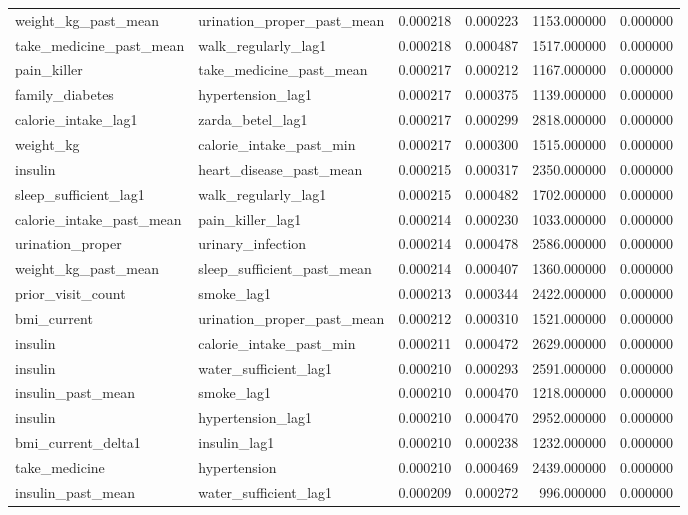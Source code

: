 \begin{longtable}{llrrrr}
weight\_kg\_past\_mean & urination\_proper\_past\_mean & 0.000218 & 0.000223 & 1153.000000 & 0.000000 \\
take\_medicine\_past\_mean & walk\_regularly\_lag1 & 0.000218 & 0.000487 & 1517.000000 & 0.000000 \\
pain\_killer & take\_medicine\_past\_mean & 0.000217 & 0.000212 & 1167.000000 & 0.000000 \\
family\_diabetes & hypertension\_lag1 & 0.000217 & 0.000375 & 1139.000000 & 0.000000 \\
calorie\_intake\_lag1 & zarda\_betel\_lag1 & 0.000217 & 0.000299 & 2818.000000 & 0.000000 \\
weight\_kg & calorie\_intake\_past\_min & 0.000217 & 0.000300 & 1515.000000 & 0.000000 \\
insulin & heart\_disease\_past\_mean & 0.000215 & 0.000317 & 2350.000000 & 0.000000 \\
sleep\_sufficient\_lag1 & walk\_regularly\_lag1 & 0.000215 & 0.000482 & 1702.000000 & 0.000000 \\
calorie\_intake\_past\_mean & pain\_killer\_lag1 & 0.000214 & 0.000230 & 1033.000000 & 0.000000 \\
urination\_proper & urinary\_infection & 0.000214 & 0.000478 & 2586.000000 & 0.000000 \\
weight\_kg\_past\_mean & sleep\_sufficient\_past\_mean & 0.000214 & 0.000407 & 1360.000000 & 0.000000 \\
prior\_visit\_count & smoke\_lag1 & 0.000213 & 0.000344 & 2422.000000 & 0.000000 \\
bmi\_current & urination\_proper\_past\_mean & 0.000212 & 0.000310 & 1521.000000 & 0.000000 \\
insulin & calorie\_intake\_past\_min & 0.000211 & 0.000472 & 2629.000000 & 0.000000 \\
insulin & water\_sufficient\_lag1 & 0.000210 & 0.000293 & 2591.000000 & 0.000000 \\
insulin\_past\_mean & smoke\_lag1 & 0.000210 & 0.000470 & 1218.000000 & 0.000000 \\
insulin & hypertension\_lag1 & 0.000210 & 0.000470 & 2952.000000 & 0.000000 \\
bmi\_current\_delta1 & insulin\_lag1 & 0.000210 & 0.000238 & 1232.000000 & 0.000000 \\
take\_medicine & hypertension & 0.000210 & 0.000469 & 2439.000000 & 0.000000 \\
insulin\_past\_mean & water\_sufficient\_lag1 & 0.000209 & 0.000272 & 996.000000 & 0.000000 \\

\end{longtable}
